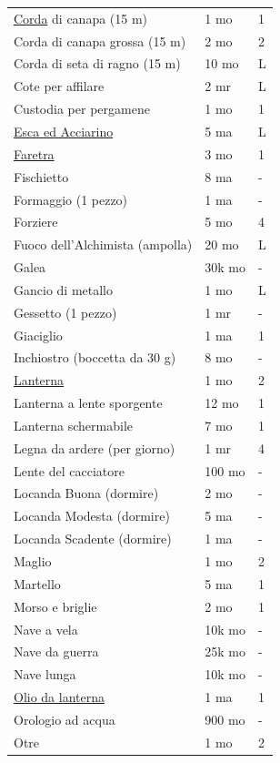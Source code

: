 \begin{multicols}{2}
\begin{tabular}{p{5cm}p{1.5cm}p{0.7cm}}
\hyperlink{Corda}{Corda} di canapa (15 m) & 1 mo & 1 \\
Corda di canapa grossa (15 m) & 2 mo & 2 \\
Corda di seta di ragno (15 m) & 10 mo & L \\
Cote per affilare & 2 mr & L \\
Custodia per pergamene & 1 mo & 1 \\
\hyperlink{Esca ed Acciarino}{Esca ed Acciarino} & 5 ma & L \\
\hyperlink{Faretra}{Faretra} & 3 mo & 1 \\
Fischietto & 8 ma & - \\
Formaggio (1 pezzo) & 1 ma & - \\
Forziere & 5 mo & 4 \\
Fuoco dell'Alchimista (ampolla) & 20 mo & L \\
Galea & 30k mo & - \\
Gancio di metallo & 1 mo & L \\
Gessetto (1 pezzo) & 1 mr & - \\
Giaciglio & 1 ma & 1 \\
Inchiostro (boccetta da 30 g) & 8 mo & - \\
\hyperlink{Lanterna}{Lanterna} & 1 mo & 2 \\
Lanterna a lente sporgente & 12 mo & 1 \\
Lanterna schermabile & 7 mo & 1 \\
Legna da ardere (per giorno) & 1 mr & 4 \\
Lente del cacciatore & 100 mo & - \\
Locanda Buona (dormire) & 2 mo & - \\
Locanda Modesta (dormire) & 5 ma & - \\
Locanda Scadente (dormire) & 1 ma & - \\
Maglio & 1 mo & 2 \\
Martello & 5 ma & 1 \\
Morso e briglie & 2 mo & 1 \\
Nave a vela & 10k mo & - \\
Nave da guerra & 25k mo & - \\
Nave lunga & 10k mo & - \\
\hyperlink{Olio da lanterna}{Olio da lanterna} & 1 ma & 1 \\
Orologio ad acqua & 900 mo & - \\
Otre & 1 mo & 2 \\
\end{tabular}
\noindent\begin{tabular}{p{5.1cm}p{1.5cm}p{0.7cm}}

\end{tabular}
\end{multicols}
